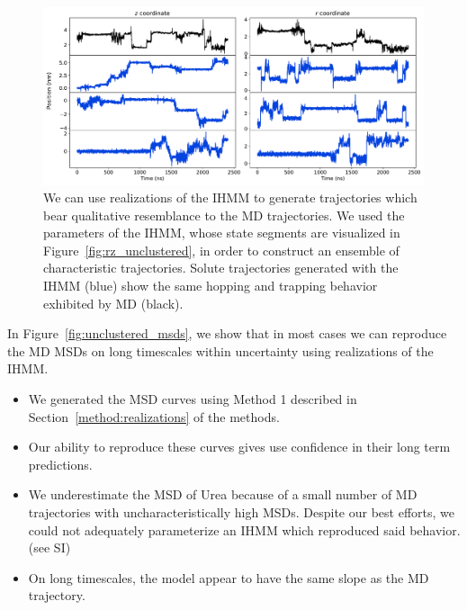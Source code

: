\documentclass[journal=jpcbfk,manuscript=article]{achemso}
\begin{document}
  \begin{figure}
  \centering
  \includegraphics[width=\textwidth]{qualitative_unclustered_MET2.pdf}
  \caption{We can use realizations of the IHMM to generate trajectories which 
  bear qualitative resemblance to the MD trajectories. We used the parameters 
  of the IHMM, whose state segments are visualized in 
  Figure~\ref{fig:rz_unclustered}, in order to construct an ensemble of 
  characteristic trajectories. Solute trajectories generated with
  the IHMM (blue) show the same hopping and trapping behavior exhibited by 
  MD (black).
  }\label{fig:qualitative_unclustered}
  \end{figure}
  
  In Figure~\ref{fig:unclustered_msds}, we show that in most cases we can reproduce the 
  MD MSDs on long timescales within uncertainty using realizations of the 
  IHMM.
  \begin{itemize}
    \item We generated the MSD curves using Method 1 described in 
    Section~\ref{method:realizations} of the methods.
    \item Our ability to reproduce these curves gives use confidence
    in their long term predictions.
    \item We underestimate the MSD of Urea because of a small number of MD 
    trajectories with uncharacteristically high MSDs. Despite our best efforts, 
    we could not adequately parameterize an IHMM which reproduced said 
    behavior. (see SI)  %
    \item On long timescales, the model appear to have the same slope as 
    the MD trajectory.
  \end{itemize}
  
\end{document}
